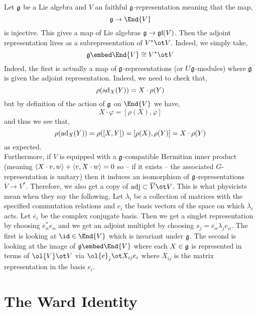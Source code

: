 \documentclass[12pt]{article}
\begin{document}
Let $\mathfrak{g}$ be a Lie algebra and $V$ an faithful $\mathfrak{g}$-representation meaning that the map,
\[ \g \to \End{V} \]
is injective. This gives a map of Lie algebras $\mathfrak{g} \to \mathfrak{gl}(V)$. Then the adjoint representation lives as a subrepresentation of $V^* \ot V$. Indeed, we simply take,
\[ \g \embed \End{V} \cong V^* \ot V \]
Indeed, the first is actually a map of $\mathfrak{g}$-representations (or $U \mathfrak{g}$-modules) where $\mathfrak{g}$ is given the adjoint representation. Indeed, we need to check that,
\[ \rho(\mathrm{ad}_X(Y)) = X \cdot \rho(Y) \]
but by definition of the action of $\mathfrak{g}$ on $\End{V}$ we have,
\[ X \cdot \varphi = [\rho(X), \varphi] \]
and thus we see that,
\[ \rho(\mathrm{ad}_X(Y)) = \rho([X,Y]) = [\rho(X), \rho(Y)] = X \cdot \rho(Y) \]
as expected. 
\bigskip\\
Furthermore, if $V$ is equipped with a $\mathfrak{g}$-compatible Hermitian inner product (meaning $\left< X \cdot v , w \right> + \left< v , X \cdot w \right> = 0$ so -- if it exists -- the associated $G$-representation is unitary) then it induces an isomorphism of $\mathfrak{g}$-representations $\overline{V} \to V^*$. Therefore, we also get a copy of $\mathrm{adj} \subset \overline{V} \ot V$. This is what physicists mean when they say the following. Let $\lambda_i$ be a collection of matrices with the specified commutation relations and $e_i$ the basis vectors of the space on which $\lambda_i$ acts. Let $\overline{e}_i$ be the complex conjugate basis. Then we get a singlet representation by choosing $\overline{e}_\alpha^* e_\alpha$ and we get an adjoint multiplet by choosing $s_j = \overline{e}_\alpha \lambda_j e_\alpha$. The first is looking at $\id \in \End{V}$ which is invariant under $\mathfrak{g}$. The second is looking at the image of $\g \embed \End{V}$ where each $X \in \mathfrak{g}$ is represented in terms of $\ol{V} \ot V$ via $\ol{e}_j \ot X_{ij} e_i$ where $X_{ij}$ is the matrix representation in the basis $e_i$. 

\section{The Ward Identity}
\end{document}
